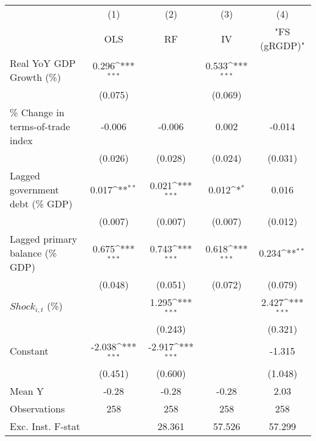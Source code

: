 {
\def\sym#1{\ifmmode^{#1}\else\(^{#1}\)\fi}
\begin{tabular}{l*{4}{c}}
\toprule
                    &\multicolumn{1}{c}{(1)}&\multicolumn{1}{c}{(2)}&\multicolumn{1}{c}{(3)}&\multicolumn{1}{c}{(4)}\\
                    &\multicolumn{1}{c}{OLS}&\multicolumn{1}{c}{RF}&\multicolumn{1}{c}{IV}&\multicolumn{1}{c}{ "FS (gRGDP)" }\\
\midrule
Real YoY GDP Growth (\%)&       0.296\sym{***}&                     &       0.533\sym{***}&                     \\
                    &     (0.075)         &                     &     (0.069)         &                     \\
\addlinespace
\% Change in terms-of-trade index&      -0.006         &      -0.006         &       0.002         &      -0.014         \\
                    &     (0.026)         &     (0.028)         &     (0.024)         &     (0.031)         \\
\addlinespace
Lagged government debt (\% GDP)&       0.017\sym{**} &       0.021\sym{***}&       0.012\sym{*}  &       0.016         \\
                    &     (0.007)         &     (0.007)         &     (0.007)         &     (0.012)         \\
\addlinespace
Lagged primary balance (\% GDP)&       0.675\sym{***}&       0.743\sym{***}&       0.618\sym{***}&       0.234\sym{**} \\
                    &     (0.048)         &     (0.051)         &     (0.072)         &     (0.079)         \\
\addlinespace
$ Shock_{i,t}$ (\%) &                     &       1.295\sym{***}&                     &       2.427\sym{***}\\
                    &                     &     (0.243)         &                     &     (0.321)         \\
\addlinespace
Constant            &      -2.038\sym{***}&      -2.917\sym{***}&                     &      -1.315         \\
                    &     (0.451)         &     (0.600)         &                     &     (1.048)         \\
\midrule
Mean Y              &       -0.28         &       -0.28         &       -0.28         &        2.03         \\
Observations        &         258         &         258         &         258         &         258         \\
Exc. Inst. F-stat   &                     &      28.361         &      57.526         &      57.299         \\
\bottomrule
\end{tabular}
}
